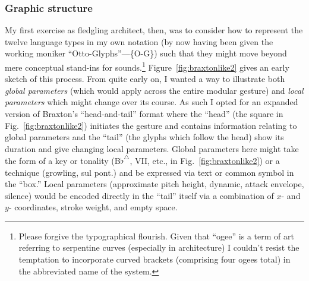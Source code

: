     \subsubsection{Graphic structure}
    My first exercise as fledgling architect, then, was to consider how to represent the twelve language types in my own notation (by now having been given the working moniker ``Otto-Glyphs''---\{O-G\}) such that they might move beyond mere conceptual stand-ins for sounds.\footnote{Please forgive the typographical flourish. Given that ``ogee'' is a term of art referring to serpentine curves (especially in architecture) I couldn't resist the temptation to incorporate curved brackets (comprising four ogees total) in the abbreviated name of the system.} Figure~\ref{fig:braxtonlike2} gives an early sketch of this process. From quite early on, I wanted a way to illustrate both \textit{global parameters} (which would apply across the entire modular gesture) and \textit{local parameters} which might change over its course. As such I opted for an expanded version of Braxton's ``head-and-tail'' format where the ``head'' (the square in Fig.~\ref{fig:braxtonlike2}) initiates the gesture and contains information relating to global parameters and the ``tail'' (the glyphs which follow the head) show its duration and give changing local parameters. Global parameters here might take the form of a key or tonality (B$\flat^{\triangle}$, VII, etc., in Fig.~\ref{fig:braxtonlike2}) or a technique (growling, sul pont.) and be expressed via text or common symbol in the ``box.'' Local parameters (approximate pitch height, dynamic, attack envelope, silence) would be encoded directly in the ``tail'' itself via a combination of $x$- and $y$- coordinates, stroke weight, and empty space.

